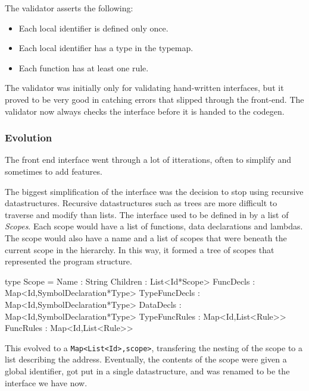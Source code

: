 The validator asserts the following:
\begin{itemize}
\item Each local identifier is defined only once.
\item Each local identifier has a type in the typemap.
\item Each function has at least one rule.
\end{itemize}

The validator was initially only for validating hand-written interfaces,
but it proved to be very good in catching errors that slipped through the front-end.
The validator now always checks the interface before it is handed to the codegen.

\subsubsection{Evolution}
The front end interface went through a lot of itterations, often to simplify and sometimes to add features.

The biggest simplification of the interface was the decision to stop using recursive datastructures.
Recursive datastructures such as trees are more difficult to traverse and modify than lists.
The interface used to be defined in by a list of \textit{Scopes}.
Each scope would have  a list of functions, data declarations and lambdas.
The scope would also have a name and a list of scopes that were beneath the current scope in the hierarchy.
In this way, it formed a tree of scopes that represented the program structure.

\begin{FS}
type Scope = {
  Name          : String
  Children      : List<Id*Scope>
  FuncDecls     : Map<Id,SymbolDeclaration*Type>
  TypeFuncDecls : Map<Id,SymbolDeclaration*Type>
  DataDecls     : Map<Id,SymbolDeclaration*Type>
  TypeFuncRules : Map<Id,List<Rule>>
  FuncRules     : Map<Id,List<Rule>>
}
\end{FS}

This evolved to a \verb|Map<List<Id>,scope>|, transfering the nesting of the scope to a list describing the address.
Eventually, the contents of the scope were given a global identifier, got put in a single datastructure, and was renamed to be the interface we have now.
